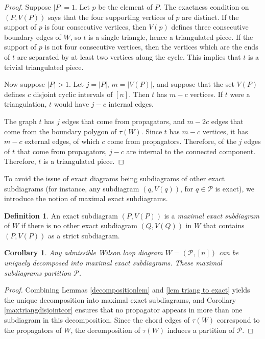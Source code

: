 \documentclass[11pt]{article}
\newcommand{\cP}{\mathcal{P}}
\newtheorem{cor}[thm]{Corollary}
\theoremstyle{remark}
\theoremstyle{definition}
\newtheorem{dfn}[thm]{Definition}
\begin{document}
\begin{proof}
Suppose $|P|=1$. Let $p$ be the element of $P$. The exactness condition on $(P, V(P))$ says that the four supporting vertices of $p$ are distinct.  If the support of $p$ is four consecutive vertices, then $V(p)$ defines three consecutive boundary edges of $W$, so $t$ is a single triangle, hence a triangulated piece.  If the support of $p$ is not four consecutive vertices, then the vertices which are the ends of $t$ are separated by at least two vertices along the cycle.  This implies that $t$ is a trivial triangulated piece.

Now suppose $|P|>1$.  Let $j=|P|$, $m=|V(P)|$, and 
suppose that the set $V(P)$ defines $c$ disjoint cyclic intervals of $[n]$. Then $t$ has $m-c$ vertices.  If $t$ were a triangulation, $t$ would have $j -c$ internal edges.

The graph $t$ has $j$ edges that come from propagators, and $m - 2c$ edges that come from the boundary polygon of $\tau(W)$. Since $t$ has $m-c$ vertices, it has $m-c$ external edges, of which $c$ come from propagators. Therefore, of the $j$ edges of $t$ that come from propagators, $j-c$ are internal to the connected component. Therefore, $t$ is a triangulated piece.


\end{proof}





To avoid the issue of exact diagrams being subdiagrams of other exact subdiagrams (for instance, any subdiagram $(q, V(q))$, for $q \in \cP$ is exact), we introduce the notion of maximal exact subdiagrams.

\begin{dfn}
An exact subdiagram $(P, V(P))$ is a {\em maximal exact subdiagram} of $W$ if there is no other exact subdiagram $(Q, V(Q))$ in $W$ that contains $(P,V(P))$ as a strict subdiagram.
\end{dfn}


\begin{cor} \label{uniqueproppartitioncor}
Any admissible Wilson loop diagram $W = (\cP, [n])$ can be uniquely decomposed into maximal exact subdiagrams. These maximal subdiagrams partition $\cP$.
\end{cor}

\begin{proof}
Combining Lemmas \ref{decompositionlem} and \ref{lem triang to exact} yields the unique decomposition into maximal exact subdiagrams, and Corollary \ref{maxtriangdisjointcor} ensures that no propagator appears in more than one subdiagram in this decomposition. Since the chord edges of $\tau(W)$ correspond to the propagators of $W$, the decomposition of $\tau(W)$ induces a partition of $\cP$.
\end{proof}
\end{document}

